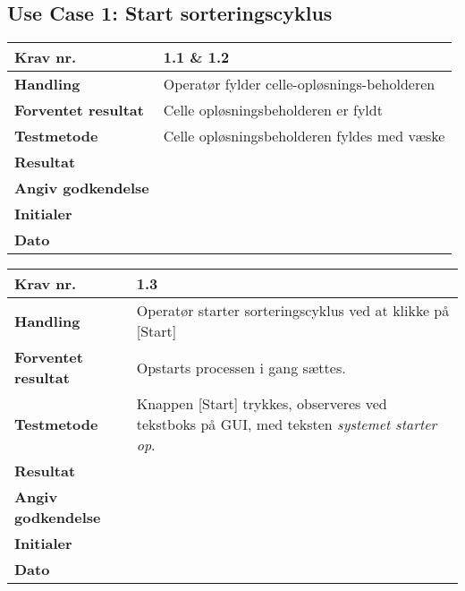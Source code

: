 \subsection{Use Case 1: Start sorteringscyklus}

	\begin{center}
		\begin{longtable}{ | m{4cm}| m{8.5cm}|} 
			\hline
			\textbf{Krav nr.} & 1.1 \& 1.2    \\ 
			\hline
			\textbf{Handling} &  Operatør fylder celle-opløsnings-beholderen   \\
			\hline
			\textbf{Forventet resultat} &  Celle opløsningsbeholderen er fyldt  \\
			\hline
			\textbf{Testmetode}  &  Celle opløsningsbeholderen fyldes med væske  \\
			\hline
			\textbf{Resultat}  &    \\
			\hline
			\textbf{Angiv godkendelse} &     \\
			\hline
			\textbf{Initialer} &     \\
			\hline
			\textbf{Dato} &    \\
			\hline
		\end{longtable}
	\end{center}
	
	
	\begin{center}
		\begin{longtable}{ | m{4cm}| m{8.5cm}|} 
			\hline
			\textbf{Krav nr.} & 1.3    \\ 
			\hline
			\textbf{Handling} &  Operatør starter sorteringscyklus ved at klikke på [Start]  \\
			\hline
			\textbf{Forventet resultat} &  Opstarts processen i gang sættes.  \\
			\hline
			\textbf{Testmetode}  & Knappen [Start] trykkes, observeres ved tekstboks på GUI, med teksten \textit{systemet starter op}.   \\
			\hline
			\textbf{Resultat}  &    \\
			\hline
			\textbf{Angiv godkendelse} &     \\
			\hline
			\textbf{Initialer} &     \\
			\hline
			\textbf{Dato} &    \\
			\hline
		\end{longtable}
	\end{center}
	
	\newpage
	
